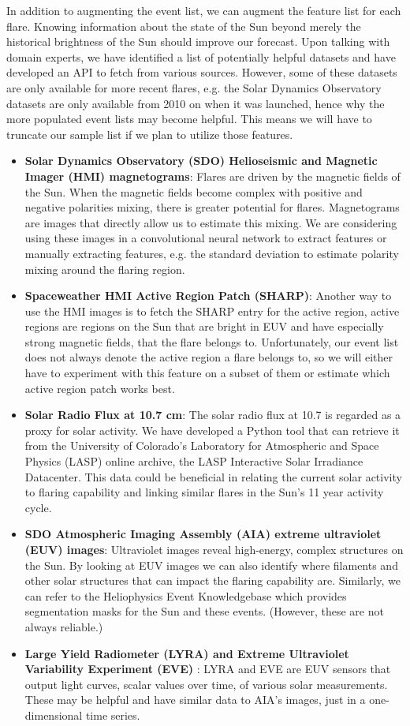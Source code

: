\documentclass[letterpaper, 10 pt, onecolumn]{ieeeconf}
\begin{document}
In addition to augmenting the event list, we can augment the feature list for each flare. Knowing information about the state of the Sun beyond merely the historical brightness of the Sun should improve our forecast. Upon talking with domain experts, we have identified a list of potentially helpful datasets and have developed an API to fetch from various sources. However, some of these datasets are only available for more recent flares, e.g. the Solar Dynamics Observatory datasets are only available from 2010 on when it was launched, hence why the more populated event lists may become helpful. This means we will have to truncate our sample list if we plan to utilize those features. 
\begin{itemize}
    \item \textbf{Solar Dynamics Observatory (SDO) Helioseismic and Magnetic Imager (HMI) magnetograms}: Flares are driven by the magnetic fields of the Sun. When the magnetic fields become complex with positive and negative polarities mixing, there is greater potential for flares. Magnetograms are images that directly allow us to estimate this mixing. We are considering using these images in a convolutional neural network to extract features or manually extracting features, e.g. the standard deviation to estimate polarity mixing around the flaring region. 
    \item \textbf{Spaceweather HMI Active Region Patch (SHARP)}: Another way to use the HMI images is to fetch the SHARP entry for the active region, active regions are regions on the Sun that are bright in EUV and have especially strong magnetic fields, that the flare belongs to. Unfortunately, our event list does not always denote the active region a flare belongs to, so we will either have to experiment with this feature on a subset of them or estimate which active region patch works best. 
    \item \textbf{Solar Radio Flux at 10.7 cm}: The solar radio flux at 10.7 is regarded as a proxy for solar activity. We have developed a Python tool that can retrieve it from the University of Colorado's Laboratory for Atmospheric and Space Physics (LASP) online archive, the LASP Interactive Solar Irradiance Datacenter. This data could be beneficial in relating the current solar activity to flaring capability and linking similar flares in the Sun's 11 year activity cycle. 
    \item \textbf{SDO Atmospheric Imaging Assembly (AIA) extreme ultraviolet (EUV) images}: Ultraviolet images reveal high-energy, complex structures on the Sun. By looking at EUV images we can also identify where filaments and other solar structures that can impact the flaring capability are. Similarly, we can refer to the Heliophysics Event Knowledgebase which provides segmentation masks for the Sun and these events. (However, these are not always reliable.) 
    \item \textbf{Large Yield Radiometer (LYRA) and Extreme Ultraviolet Variability Experiment (EVE) }: LYRA and EVE \cite{lyra} are EUV sensors that output light curves, scalar values over time, of various solar measurements. These may be helpful and have similar data to AIA's images, just in a one-dimensional time series. 
\end{itemize}
\end{document}
